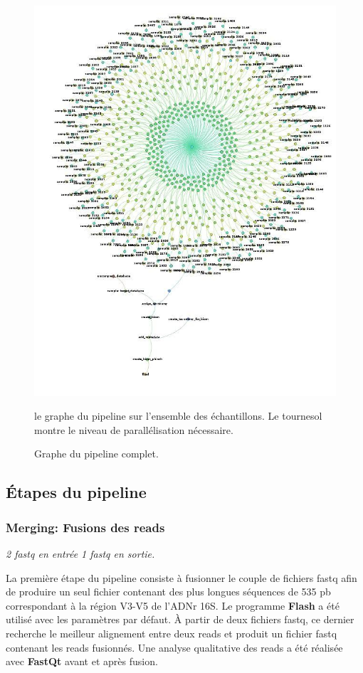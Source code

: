 \documentclass[12pt,a4paper]{article}
\begin{document}
\begin{figure}[ht]
\begin{center}
\includegraphics[scale=0.4]{img/dag.jpg}\hfill
\end{center}
\caption{Graphe du pipeline complet.}
le graphe du pipeline sur l'ensemble des échantillons. Le tournesol montre le niveau de parallélisation nécessaire.
\label{dag}
\end{figure}

\subsection{Étapes du pipeline}
\subsubsection{Merging: Fusions des reads}
\noindent\emph{ 2 fastq en entrée 1 fastq en sortie. }

La première étape du pipeline consiste à fusionner le couple de fichiers fastq afin de produire un seul fichier contenant des plus longues séquences de 535 pb correspondant à la région V3-V5 de l’ADNr 16S.
Le programme \textbf{Flash}\cite{Mago2011} a été utilisé avec les paramètres par défaut. À partir de deux fichiers fastq, ce dernier recherche le meilleur alignement entre deux reads et produit un fichier fastq contenant les reads fusionnés.
Une analyse qualitative des reads a été réalisée avec \textbf{FastQt}\citep{Labsquareteam2017} avant et après fusion.
\end{document}
